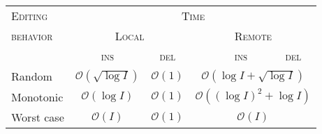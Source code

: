
\begin{tabularx}{0.455\textwidth}{@{}Xcccc@{}}
  \toprule
  \textsc{Editing} & \multicolumn{4}{c}{\textsc{Time}} \\
  \textsc{behavior} & \multicolumn{2}{c}{\textsc{Local}} & \multicolumn{2}{c}{\textsc{Remote}} \\ \cmidrule(r){2-3} \cmidrule(l){4-5}
  & \textsc{ins} & \textsc{del} & \ \ \ \ \textsc{ins} & \textsc{del}  \\ \midrule
  Random & $\mathcal{O}(\sqrt{\log I})$ & $\mathcal{O}(1)$ & \multicolumn{2}{c}{$\mathcal{O}(\log I + \sqrt{\log I})$} \\
  Monotonic & $\mathcal{O}(\log I)$ & $\mathcal{O}(1)$ & \multicolumn{2}{c}{$\mathcal{O}((\log I)^2 +\log I)$} \\
  Worst case & $\mathcal{O}(I)$ & $\mathcal{O}(1)$ & \multicolumn{2}{c}{$\mathcal{O}(I)$} \\ \bottomrule
\end{tabularx}

